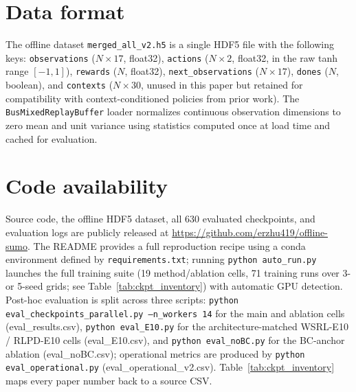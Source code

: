\documentclass[journal,10pt]{IEEEtran}
\begin{document}
\section{Data format}
\label{app:data}

The offline dataset \texttt{merged\_all\_v2.h5} is a single HDF5 file with the following keys: \texttt{observations} ($N \times 17$, float32), \texttt{actions} ($N \times 2$, float32, in the raw tanh range $[-1,1]$), \texttt{rewards} ($N$, float32), \texttt{next\_observations} ($N \times 17$), \texttt{dones} ($N$, boolean), and \texttt{contexts} ($N \times 30$, unused in this paper but retained for compatibility with context-conditioned policies from prior work). The \texttt{BusMixedReplayBuffer} loader normalizes continuous observation dimensions to zero mean and unit variance using statistics computed once at load time and cached for evaluation.

\section{Code availability}
\label{app:code}

Source code, the offline HDF5 dataset, all 630 evaluated checkpoints, and evaluation logs are publicly released at \url{https://github.com/erzhu419/offline-sumo}. The README provides a full reproduction recipe using a conda environment defined by \texttt{requirements.txt}; running \texttt{python auto\_run.py} launches the full training suite (19 method/ablation cells, 71 training runs over 3- or 5-seed grids; see Table~\ref{tab:ckpt_inventory}) with automatic GPU detection. Post-hoc evaluation is split across three scripts: \texttt{python eval\_checkpoints\_parallel.py --n\_workers 14} for the main and ablation cells (eval\_results.csv), \texttt{python eval\_E10.py} for the architecture-matched WSRL-E10 / RLPD-E10 cells (eval\_E10.csv), and \texttt{python eval\_noBC.py} for the BC-anchor ablation (eval\_noBC.csv); operational metrics are produced by \texttt{python eval\_operational.py} (eval\_operational\_v2.csv). Table~\ref{tab:ckpt_inventory} maps every paper number back to a source CSV.
\end{document}
